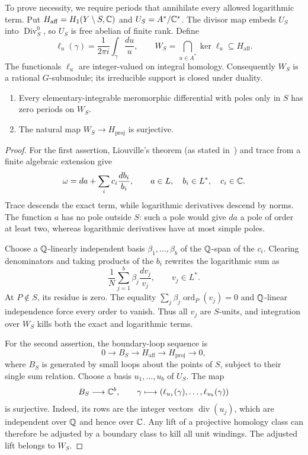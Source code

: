 To prove necessity, we require periods that annihilate every allowed
logarithmic term.  Put $H_{\mathrm{aff}}=H_1(Y\setminus S,\mathbb C)$ and
$U_S=A^*/\mathbb C^*$.  The divisor map embeds $U_S$ into
$\operatorname{Div}^0_S$, so $U_S$ is free abelian of finite rank.  Define
\[
 \ell_u(\gamma)=\frac1{2\pi i}\int_\gamma\frac{du}{u},\qquad
 W_S=\bigcap_{u\in A^*}\ker\ell_u\subseteq H_{\mathrm{aff}}.
\]
The functionals $\ell_u$ are integer-valued on integral homology.
Consequently $W_S$ is a rational $G$-submodule; its irreducible support
is closed under duality.

\begin{lemma}
\label{lem:unit-periods}
\begin{enumerate}
\item Every elementary-integrable meromorphic differential with poles only
in $S$ has zero periods on $W_S$.
\item The natural map $W_S\to H_{\mathrm{proj}}$ is surjective.
\end{enumerate}
\end{lemma}

\begin{proof}
For the first assertion, Liouville's theorem
(as stated in~\cite[Theorem~3.2]{Chen2022}) and trace from a finite
algebraic extension give
\[
 \omega=da+\sum_i c_i\frac{db_i}{b_i},\qquad
 a\in L,\quad b_i\in L^*,\quad c_i\in\mathbb C.
\]
Trace descends the exact term, while logarithmic derivatives descend by
norms.  The function $a$ has no pole outside $S$: such a pole would give
$da$ a pole of order at least two, whereas logarithmic derivatives have
at most simple poles.

Choose a $\mathbb Q$-linearly independent basis $\beta_1,\ldots,\beta_b$ of
the $\mathbb Q$-span of the $c_i$.  Clearing denominators and taking products
of the $b_i$ rewrites the logarithmic sum as
\[
 \frac1N\sum_{j=1}^b\beta_j\frac{dv_j}{v_j},\qquad v_j\in L^*.
\]
At $P\notin S$, its residue is zero.  The equality
$\sum_j\beta_j\operatorname{ord}_P(v_j)=0$ and $\mathbb Q$-linear
independence force every order to vanish.  Thus all $v_j$ are $S$-units,
and integration over $W_S$ kills both the exact and logarithmic terms.

For the second assertion, the boundary-loop sequence is
\[
 0\longrightarrow B_S\longrightarrow H_{\mathrm{aff}}
   \longrightarrow H_{\mathrm{proj}}\longrightarrow0,
\]
where $B_S$ is generated by small loops about the points of $S$, subject
to their single sum relation.  Choose a basis $u_1,\ldots,u_b$ of $U_S$.
The map
\[
 B_S\longrightarrow\mathbb C^b,
 \qquad \gamma\longmapsto
       (\ell_{u_1}(\gamma),\ldots,\ell_{u_b}(\gamma))
\]
is surjective.  Indeed, its rows are the integer vectors
$\operatorname{div}(u_j)$, which are independent over $\mathbb Q$ and hence
over $\mathbb C$.  Any lift of a projective homology class can therefore be
adjusted by a boundary class to kill all unit windings.  The adjusted
lift belongs to $W_S$.
\end{proof}

